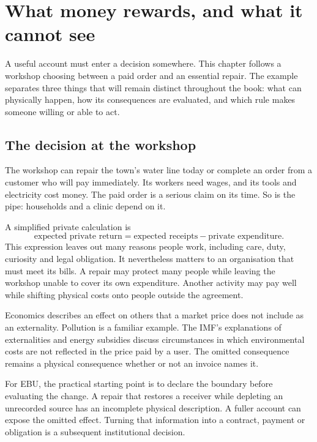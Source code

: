 \chapter{What money rewards, and what it cannot see}\label{ch:money}

A useful account must enter a decision somewhere. This chapter follows a workshop choosing between a paid order and an essential repair. The example separates three things that will remain distinct throughout the book: what can physically happen, how its consequences are evaluated, and which rule makes someone willing or able to act.

\section{The decision at the workshop}
The workshop can repair the town's water line today or complete an order from a customer who will pay immediately. Its workers need wages, and its tools and electricity cost money. The paid order is a serious claim on its time. So is the pipe: households and a clinic depend on it.

A simplified private calculation is
\begin{equation}
 \text{expected private return}
 =\text{expected receipts}-\text{private expenditure}.
\end{equation}
This expression leaves out many reasons people work, including care, duty, curiosity and legal obligation. It nevertheless matters to an organisation that must meet its bills. A repair may protect many people while leaving the workshop unable to cover its own expenditure. Another activity may pay well while shifting physical costs onto people outside the agreement.

Economics describes an effect on others that a market price does not include as an externality. Pollution is a familiar example. The IMF's explanations of externalities and energy subsidies discuss circumstances in which environmental costs are not reflected in the price paid by a user.\cite{intro-externality,intro-imf-fossil} The omitted consequence remains a physical consequence whether or not an invoice names it.

For EBU, the practical starting point is to declare the boundary before evaluating the change. A repair that restores a receiver while depleting an unrecorded source has an incomplete physical description. A fuller account can expose the omitted effect. Turning that information into a contract, payment or obligation is a subsequent institutional decision.

